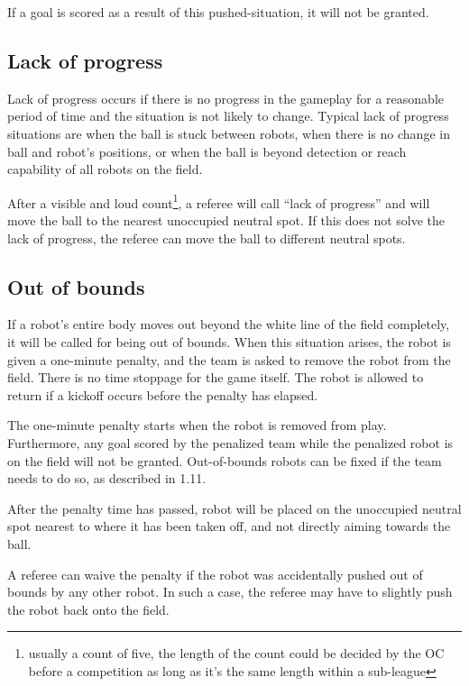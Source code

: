 \documentclass{article}
\begin{document}
If a goal is scored as a result of this pushed-situation, it will not be
granted.

\subsection{Lack of progress \label{ref-010}}

Lack of progress occurs if there is no progress in the gameplay for a
reasonable period of time and the situation is not likely to change. Typical
lack of progress situations are when the ball is stuck between robots, when
there is no change in ball and robot's positions, or when the ball is beyond
detection or reach capability of all robots on the field.

After a visible and loud count\footnote{usually a count of five, the length of
the count could be decided by the OC before a competition as long as it's
the same length within a sub-league}, a referee will call ``lack of
progress'' and will move the ball to the nearest unoccupied neutral spot. If
this does not solve the lack of progress, the referee can move the ball to
different neutral spots.

\subsection{Out of bounds \label{ref-011}}

If a robot's entire body moves out beyond the white line of the field
completely, it will be called for being out of bounds. When this situation
arises, the robot is given a one-minute penalty, and the team is asked to
remove the robot from the field. There is no time stoppage for the game itself.
The robot is allowed to return if a kickoff occurs before the penalty has
elapsed.

The one-minute penalty starts when the robot is removed from play. Furthermore,
any goal scored by the penalized team while the penalized robot is on the field
will not be granted. Out-of-bounds robots can be fixed if the team needs to do
so, as described in 1.11.

After the penalty time has passed, robot will be placed on the unoccupied
neutral spot nearest to where it has been taken off, and not directly aiming
towards the ball.

A referee can waive the penalty if the robot was accidentally pushed out of
bounds by any other robot. In such a case, the referee may have to slightly
push the robot back onto the field.
\end{document}
